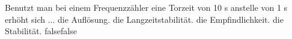     {Benutzt man bei einem Frequenzzähler eine Torzeit von 10 s anstelle von 1 s erhöht sich ...}
    {die Auflösung.}
    {die Langzeitstabilität.}
    {die Empfindlichkeit.}
    {die Stabilität.}
    {false}{false}